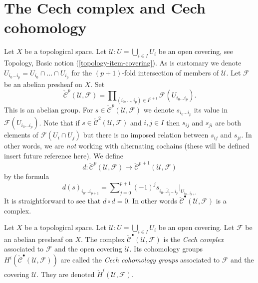 \section{The Cech complex and Cech cohomology}
\label{section-cech}

\noindent
Let $X$ be a topological space.
Let $\mathcal{U} : U = \bigcup_{i \in I} U_i$ be an open covering,
see Topology, Basic notion (\ref{topology-item-covering}).
As is customary we denote
$U_{i_0\ldots i_p} = U_{i_0} \cap \ldots \cap U_{i_p}$ for the
$(p + 1)$-fold intersection of members of $\mathcal{U}$.
Let $\mathcal{F}$ be an abelian presheaf on $X$.
Set
$$
\check{\mathcal{C}}^p(\mathcal{U}, \mathcal{F})
=
\prod\nolimits_{(i_0, \ldots, i_p) \in I^{p + 1}}
\mathcal{F}(U_{i_0\ldots i_p}).
$$
This is an abelian group. For
$s \in \check{\mathcal{C}}^p(\mathcal{U}, \mathcal{F})$ we denote
$s_{i_0\ldots i_p}$ its value in $\mathcal{F}(U_{i_0\ldots i_p})$.
Note that if $s \in \check{\mathcal{C}}^2(\mathcal{U}, \mathcal{F})$
and $i, j \in I$ then $s_{ij}$ and $s_{ji}$ are both elements
of $\mathcal{F}(U_i \cap U_j)$ but there is no imposed
relation between $s_{ij}$ and $s_{ji}$. In other words, we are {\it not}
working with alternating cochains (these will be defined
insert future reference here). We define
$$
d : \check{\mathcal{C}}^p(\mathcal{U}, \mathcal{F})
\longrightarrow
\check{\mathcal{C}}^{p + 1}(\mathcal{U}, \mathcal{F})
$$
by the formula
\begin{equation}
\label{equation-d-cech}
d(s)_{i_0\ldots i_{p + 1}}
=
\sum\nolimits_{j = 0}^{p + 1}
(-1)^j
s_{i_0\ldots \hat i_j \ldots i_p}|_{U_{i_0\ldots i_{p + 1}}}
\end{equation}
It is straightforward to see that $d \circ d = 0$. In other words
$\check{\mathcal{C}}^\bullet(\mathcal{U}, \mathcal{F})$ is a complex.

\begin{definition}
\label{definition-cech-complex}
Let $X$ be a topological space.
Let $\mathcal{U} : U = \bigcup_{i \in I} U_i$ be an open covering.
Let $\mathcal{F}$ be an abelian presheaf on $X$.
The complex $\check{\mathcal{C}}^\bullet(\mathcal{U}, \mathcal{F})$
is the {\it Cech complex} associated to $\mathcal{F}$ and the
open covering $\mathcal{U}$. Its cohomology groups
$H^i(\check{\mathcal{C}}^\bullet(\mathcal{U}, \mathcal{F}))$ are
called the {\it Cech cohomology groups} associated to
$\mathcal{F}$ and the covering $\mathcal{U}$.
They are denoted $\check H^i(\mathcal{U}, \mathcal{F})$.
\end{definition}

